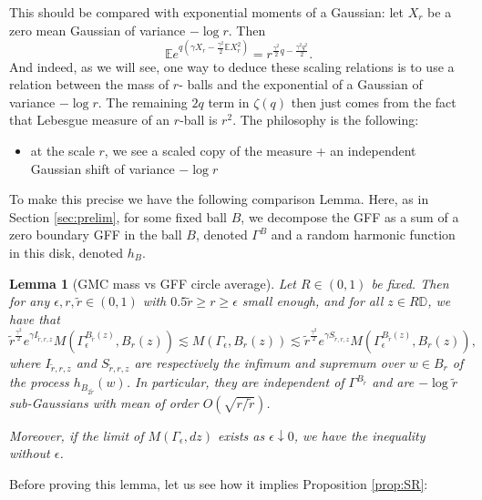 \documentclass[11pt]{amsart}
\newtheorem{lemma}[thm]{Lemma}
\newcommand{\D}{\mathbb D}
\newcommand{\E}{\mathbb E}
\renewcommand{\1}{\mathbf 1}
\newcommand{\eps}{\epsilon}
\begin{document}
This should be compared with exponential moments of a Gaussian: let $X_r$ be a zero mean Gaussian of variance $-\log r$. Then
$$\E e^{q(\gamma X_r - \frac{\gamma^2}{2}\E X_r^2)} = r^{\frac{\gamma^2}{2}q - \frac{\gamma^2 q^2}{2}}.$$
And indeed, as we will see, one way to deduce these scaling relations is to use a relation between the mass of $r$- balls and the exponential of a Gaussian of variance $-\log r$. The remaining $2q$ term in $\zeta(q)$ then just comes from the fact that Lebesgue measure of an $r$-ball is $r^2$. The philosophy is the following: 
\begin{itemize}
\item at the scale $r$, we see a scaled copy of the measure + an independent Gaussian shift of variance $-\log r$
\end{itemize}

To make this precise we have the following comparison Lemma. Here, as in Section \ref{sec:prelim}, for some fixed ball $B$, we decompose the GFF as a sum of a zero boundary GFF in the ball $B$, denoted $\Gamma^B$ and a random harmonic function in this disk, denoted $h_B$. 

\begin{lemma}[GMC mass vs GFF circle average]\label{lem:cmp}
Let $R \in (0,1)$ be fixed. Then for any $\eps, r, \tilde r \in (0,1)$ with $0.5\tilde r \geq r \geq \eps$ small enough, and for all $z \in R\D$, we have that
$$\tilde r^{\frac{\gamma^2}{2}}e^{\gamma I_{\tilde r, r,z} }M(\Gamma_\eps^{B_{\tilde r}(z)}, B_r(z)) \lesssim M(\Gamma_\eps, B_{r}(z)) \lesssim \tilde r^{\frac{\gamma^2}{2}}e^{\gamma S_{\tilde r,r,z}} M(\Gamma_\eps^{B_{\tilde r}(z)}, B_r(z)),$$
where $I_{\tilde r, r,z}$ and $S_{\tilde r, r,z}$ are respectively the infimum and supremum over $w \in B_{r}$ of the process $h_{B_{2\tilde r}}(w)$. In particular, they are independent of $\Gamma^{B_{\tilde r}}$ and are $-\log \tilde r$ sub-Gaussians with mean of order $O(\sqrt{r/\tilde r})$.

Moreover, if the limit of $M(\Gamma_\eps, dz)$ exists as $\eps \downarrow 0$, we have the inequality without $\eps$.
\end{lemma}


Before proving this lemma, let us see how it implies Proposition \ref{prop:SR}:
\end{document}
